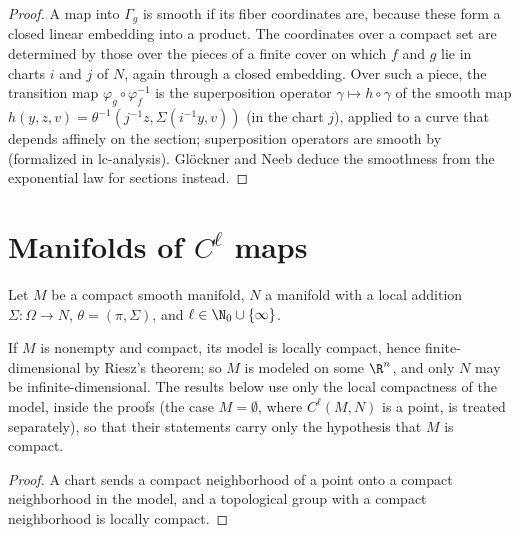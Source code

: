 \begin{proof}
  \leanok
  A map into $\Gamma_g$ is smooth if its fiber coordinates are, because these form a closed linear
  embedding into a product. The coordinates over a compact set are determined by those over the
  pieces of a finite cover on which $f$ and $g$ lie in charts $i$ and $j$ of $N$, again through a
  closed embedding. Over such a piece, the transition map $\varphi_g \circ \varphi_f^{-1}$ is the
  superposition operator $\gamma \mapsto h \circ \gamma$ of the smooth map
  $h(y, z, v) = \theta^{-1}(j^{-1} z, \Sigma(i^{-1} y, v))$ (in the chart $j$), applied to a curve
  that depends affinely on the section; superposition operators are smooth by
  \cite[Prop.~1.7.1]{GN26} (formalized in lc-analysis). Glöckner and Neeb deduce the smoothness
  from the exponential law for sections instead.
\end{proof}

\section{Manifolds of \texorpdfstring{$C^\ell$}{C\^{}l} maps}

Let $M$ be a compact smooth manifold, $N$ a manifold with a local addition
$\Sigma \colon \Omega \to N$, $\theta = (\pi, \Sigma)$, and $\ell \in \N_0 \cup \{\infty\}$.

\begin{lemma}
  \label{lem:compact-finite-dim}
  \leanok
  If $M$ is nonempty and compact, its model is locally compact, hence finite-dimensional by
  Riesz's theorem; so $M$ is modeled on some $\R^n$, and only $N$ may be infinite-dimensional.
  The results below use only the local compactness of the model, inside the proofs (the case
  $M = \emptyset$, where $C^\ell(M, N)$ is a point, is treated separately), so that their
  statements carry only the hypothesis that $M$ is compact.
\end{lemma}

\begin{proof}
  \leanok
  A chart sends a compact neighborhood of a point onto a compact neighborhood in the model, and a
  topological group with a compact neighborhood is locally compact.
\end{proof}

